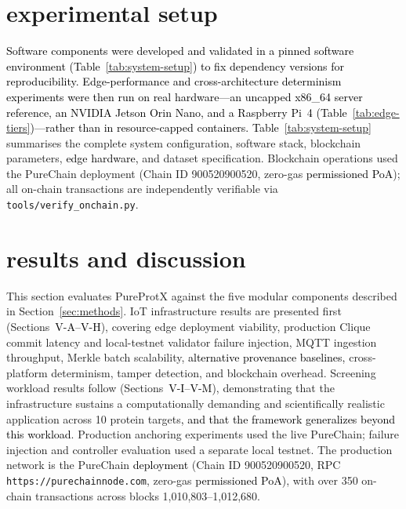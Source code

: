 \documentclass[conference]{IEEEtran}
\newcommand{\rev}[2]{#2}
\begin{document}
\begin{table}[!htbp]
{\begin{tabular}{p{2.6cm} p{2.8cm} p{4.5cm}}
\bottomrule
\end{tabular}}
\end{table}
\section{\textbf{experimental setup}}
\label{sec:experiments}
\textcolor{black}{Software components were developed and validated in a pinned
software environment (\textcolor{black}{Table~\ref{tab:system-setup}}) to fix dependency versions for reproducibility.
Edge-performance and cross-architecture determinism experiments were then run
on real hardware---an uncapped x86\_64 server reference, an NVIDIA Jetson
Orin Nano, and a Raspberry Pi~4 (\textcolor{black}{Table~\ref{tab:edge-tiers}})---rather than in resource-capped
containers.} \textcolor{black}{Table~\ref{tab:system-setup}} summarises the complete system configuration, software
stack, blockchain parameters, \textcolor{black}{edge hardware,} and dataset
specification. Blockchain operations used the PureChain
deployment (Chain ID 900520900520, zero-gas \textcolor{black}{permissioned
PoA}); all on-chain transactions are independently verifiable via
\texttt{tools/verify\_onchain.py}.

\section{\textbf{results and discussion}}
\label{sec:results}

This section evaluates PureProtX against the five modular
components described in Section~\ref{sec:methods}.
IoT infrastructure results are presented first
(Sections~\textcolor{black}{V-A–V-H}), covering edge deployment viability,
\rev{R2.4}{production Clique commit latency and local-testnet validator failure injection}, MQTT
ingestion throughput, Merkle batch scalability, \textcolor{black}{alternative
provenance baselines,} cross-platform determinism, tamper detection, and
blockchain overhead. Screening workload results follow
(Sections~\textcolor{black}{V-I–V-M}), demonstrating that the infrastructure
sustains a computationally demanding and scientifically realistic application
across 10 protein targets\textcolor{black}{, and that the framework
generalizes beyond this workload}.
\rev{R1.3}{Production anchoring experiments used the live PureChain; failure injection and controller evaluation used a separate local testnet. The production network is the PureChain}
\textcolor{black}{deployment} (Chain ID 900520900520, RPC
\texttt{https://purechainnode.com}, zero-gas
\textcolor{black}{permissioned PoA}), with over 350 on-chain transactions
across blocks 1,010,803–1,012,680.
\end{document}

